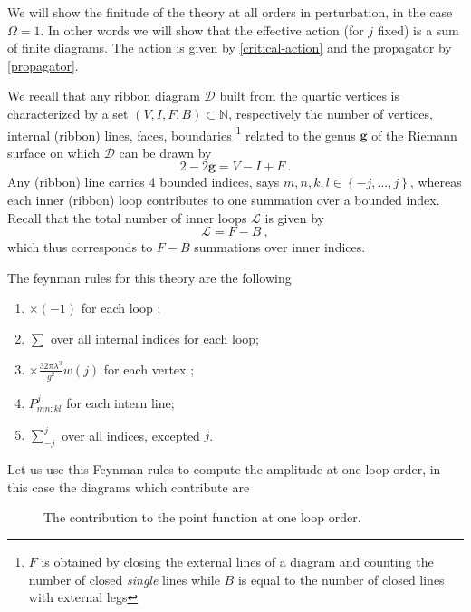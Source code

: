 \documentclass[a4paper,11pt,twoside]{article}
\numberwithin{equation}{section}
\theoremstyle{nonumberplain}
\newcounter{and}
\begin{document}
We will show the finitude of the theory at all orders in perturbation, in the case $\Omega=1$. In other words we will show that the effective action (for $j$ fixed) is a sum of finite diagrams. The action is given by \eqref{critical-action} and the propagator by \eqref{propagator}. \par%
%
We recall that any ribbon diagram $\mathcal{D}$ built from the quartic vertices is characterized by a set $(V,I,F,B)\subset\mathbb{N}$, respectively the number of vertices, internal (ribbon) lines, faces, boundaries {\footnote{$F$ is obtained by closing the external lines of a diagram and counting the number of closed {\it{single}} lines while $B$ is equal to the number of closed lines with external legs}} related to the genus $\mathbf{g}$ of the Riemann surface on which $\mathcal{D}$ can be drawn by%
%
\begin{equation}
2-2\mathbf{g}=V-I+F \ . \label{euler}
\end{equation}
%
Any (ribbon) line carries 4 bounded indices, says $m,n,k,l\in\left\{-j,...,j\right\}$, whereas each inner (ribbon) loop contributes to one summation over a bounded index. Recall that the total number of inner loops $\mathcal{L}$ is given by%
%
\begin{equation}
\mathcal{L}=F-B \ , \label{loops-number}
\end{equation}
%
which thus corresponds to $F-B$ summations over inner indices.\par%
%
The feynman rules for this theory are the following%
%
\begin{enumerate}
 \item $\times(-1)$ for each loop ;
 \item $\sum$ over all internal indices for each loop;
 \item $\times\frac{32\pi\lambda^3}{g^2}w(j)$ for each vertex ;
 \item $P^{j}_{mn;kl}$ for each intern line;
 \item $\sum^j_{-j}$ over all indices, excepted $j$.
\end{enumerate}
%
Let us use this Feynman rules to compute the amplitude at one loop order, in this case the diagrams which contribute are%
%
\begin{figure}[h!]
\begin{center}
\TwoPfPLa
\hspace*{30pt}
\TwoPfPLb
\hspace*{30pt}
\TwoPfNPL
\caption{The contribution to the point function at one loop order.} 
\label{fig:TwoPf}
\end{center}
\vspace*{-15pt}
\end{figure}
\end{document}
